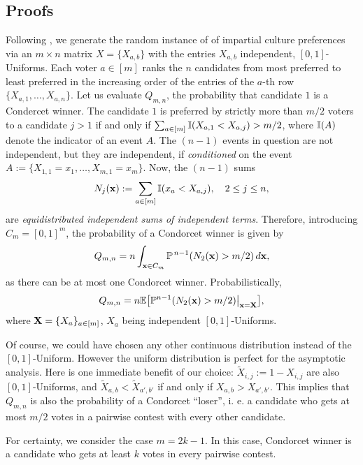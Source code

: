 \documentclass[11pt]{amsart}
\theoremstyle{remark}
\numberwithin{equation}{section}
\begin{document}
\subsection{Proofs}  Following \cite{Sau}, we generate the random instance of of
impartial culture preferences via an $m\times n$ matrix $X=\{X_{a,b}\}$ with the entries $X_{a,b}$ independent, $[0,1]$-Uniforms. Each voter $a\in [m]$ ranks the $n$ candidates from most preferred to least preferred in the increasing order of the entries of the $a$-th row $\{X_{a,1},\dots, X_{a,n}\}$. Let us evaluate $Q_{m,n}$, the probability that candidate $1$ is a Condercet winner. The candidate $1$ is preferred by strictly more than $m/2$ voters to a candidate $j>1$ if and only if $\sum_{a\in [m]}\Bbb I(X_{a,1}< X_{a,j})>m/2$, where $\Bbb I(A)$ denote the indicator of an event $A$. The $(n-1)$ events in question are not independent, but they are independent, if {\it conditioned\/} on the event $A:=\{X_{1,1}=x_1,\dots, X_{m,1}=x_m\}$. Now, the $(n-1)$ sums 
\begin{equation}\label{n1}
N_j(\bold x):=\sum_{a\in [m]}\Bbb I(x_a< X_{a,j}),\quad 2\le j\le n,
\end{equation}
are {\it equidistributed independent sums of independent terms\/}. Therefore,  introducing $C_{m}=[0,1]^{m}$,
the probability of a Condorcet winner is given by
\begin{equation}\label{n1.1}
Q_{m,n}=n\int_{\bold x\in C_{m}}\Bbb P^{\,n-1}(N_2(\bold x)>m/2)\,d\bold x,
\end{equation}
as there can be at most one Condorcet winner. Probabilistically,
\[
Q_{m,n}=n\Bbb E\bigl[\Bbb P^{n-1}(N_2(\bold x)>m/2)\big|_{\bold x=\bold X}\bigr],
\]
where $\bold X=\{X_a\}_{a\in [m]}$, $X_a$ being independent $[0,1]$-Uniforms. 

 Of course, we could have chosen any other continuous distribution instead of the $[0,1]$-Uniform. However the uniform distribution is perfect for the asymptotic analysis. Here is one immediate benefit of our choice: $\tilde X_{i,j}:=1-X_{i,j}$ are also $[0,1]$-Uniforms, and $\tilde X_{a,b}< \tilde X_{a',b'}$ if and only if $X_{a,b}>X_{a',b'}$. This implies that $Q_{m,n}$ is also the probability of a Condorcet ``loser'', i. e. a candidate who gets at most $m/2$ votes in a pairwise contest with every other candidate. 

For certainty, we consider the case $m=2k-1$. In this case, Condorcet winner is a candidate who gets at least $k$ votes in every pairwise contest.
\end{document}
